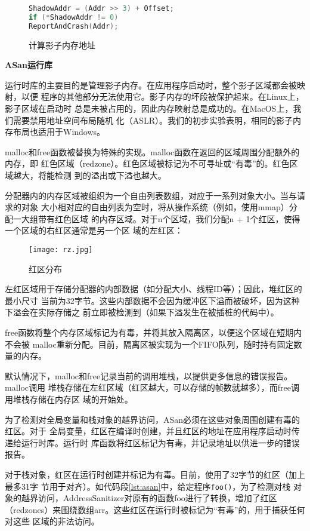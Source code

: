 \begin{figure}[H]
\begin{lstlisting}[language=C++]
ShadowAddr = (Addr >> 3) + Offset;
if (*ShadowAddr != 0)
ReportAndCrash(Addr);
\end{lstlisting}
\caption{计算影子内存地址}
\label{lst:shadowaddr}
\end{figure}


\textbf{ASan运行库}

运行时库的主要目的是管理影子内存。在应用程序启动时，整个影子区域都会被映射，以便
程序的其他部分无法使用它。影子内存的坏段被保护起来。在Linux上，影子区域在启动时
总是未被占用的，因此内存映射总是成功的。在MacOS上，我们需要禁用地址空间布局随机
化（ASLR）。我们的初步实验表明，相同的影子内存布局也适用于Windows。

malloc和free函数被替换为特殊的实现。malloc函数在返回的区域周围分配额外的内存，即
红色区域（redzone）。红色区域被标记为不可寻址或“有毒”的。红色区域越大，将能检测
到的溢出或下溢也越大。

分配器内的内存区域被组织为一个自由列表数组，对应于一系列对象大小。当与请求的对象
大小相对应的自由列表为空时，将从操作系统（例如，使用mmap）分配一大组带有红色区域
的内存区域。对于n个区域，我们分配n + 1个红区，使得一个区域的右红区通常是另一个区
域的左红区：

\begin{figure}[ht]
	\centering
	\texttt{[image: rz.jpg]}
	\caption{红区分布}
	\label{fig:rz}
\end{figure}

左红区域用于存储分配器的内部数据（如分配大小、线程ID等）；因此，堆红区的最小尺寸
当前为32字节。这些内部数据不会因为缓冲区下溢而被破坏，因为这种下溢会在实际存储之
前立即被检测到（如果下溢发生在被插桩的代码中）。

free函数将整个内存区域标记为有毒，并将其放入隔离区，以便这个区域在短期内不会被
malloc重新分配。目前，隔离区被实现为一个FIFO队列，随时持有固定数量的内存。

默认情况下，malloc和free记录当前的调用堆栈，以提供更多信息的错误报告。malloc调用
堆栈存储在左红区域（红区越大，可以存储的帧数就越多），而free调用堆栈存储在内存区
域的开始处。

为了检测对全局变量和栈对象的越界访问，ASan必须在这些对象周围创建有毒的红区。对于
全局变量，红区在编译时创建，并且红区的地址在应用程序启动时传递给运行时库。运行时
库函数将红区标记为有毒，并记录地址以供进一步的错误报告。

对于栈对象，红区在运行时创建并标记为有毒。目前，使用了32字节的红区（加上最多31字
节用于对齐）。如代码段\ref{lst:asan}中，给定程序\texttt{foo()}，为了检测对栈
对象的越界访问，AddressSanitizer对原有的函数foo进行了转换，增加了红区
（redzones）来围绕数组arr。这些红区在运行时被标记为“有毒”的，用于捕获任何对这些
区域的非法访问。

